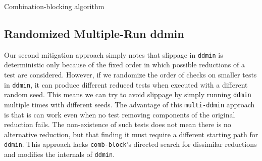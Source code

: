 \begin{algorithm}
\begin{algorithmic}[1]
\EndIf
{}
\Else
{}
\EndIf
\EndIf
\EndFor
\EndFor
{}
\EndWhile
{}
\end{algorithmic}
\caption{Combination-blocking algorithm}
\label{comb-block}
\end{algorithm}

\subsection{Randomized Multiple-Run ddmin}

Our second mitigation approach simply notes that slippage in {\tt ddmin} is
deterministic only because of the fixed order in which possible
reductions of a test  are considered.  However, if we randomize
the order of checks on smaller tests in {\tt ddmin}, it can produce different
reduced tests when executed with a different random seed.  This means
we can try to avoid slippage by simply running {\tt ddmin} multiple
times with different seeds.  The advantage of this {\tt multi-ddmin}
approach is that is can work even when no test removing
components of the original reduction fails.  The non-existence of such
tests does not mean
there is no alternative reduction, but that finding it must
require a different starting path for {\tt ddmin}.
This approach lacks {\tt comb-block}'s directed search
for dissimilar reductions and modifies the internals of {\tt ddmin}.
